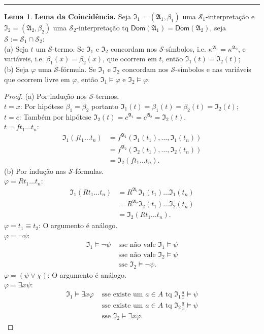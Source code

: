 \documentclass[11pt]{article}
\theoremstyle{definition}
\newtheorem{lemma}{Lema}
\newcommand{\mc}[1]{\mathcal{#1}}
\newcommand{\mf}[1]{\mathfrak{#1}}
\newcommand{\msf}[1]{\mathsf{#1}}
\begin{document}
\hrule

\begin{lemma}
\textbf{Lema da Coincidência.} Seja $\mf{I}_1=(\mf{A}_1,\beta_1)$ uma $\mc{S}_1$-interpretação e $\mf{I}_2=(\mf{A}_2,\beta_2)$ uma $\mc{S}_2$-interpretação tq $\msf{Dom}(\mf{A}_1)=\msf{Dom}(\mf{A}_2)$, seja $\mc{S}:=\mc{S}_1\cap\mc{S}_2$:\\
(a) Seja $t$ um $\mc{S}$-termo. Se $\mf{I}_1$ e $\mf{I}_2$ concordam nos $\mc{S}$-símbolos, i.e. $\kappa^\mf{A_1}=\kappa^\mf{A_2}$, e variáveis, i.e. $\beta_1(x)=\beta_2(x)$, que ocorrem em $t$, então $\mf{I}_1(t)=\mf{I}_2(t)$;\\
(b) Seja $\varphi$ uma $\mc{S}$-fórmula. Se $\mf{I}_1$ e $\mf{I}_2$ concordam nos $\mc{S}$-símbolos e nas variáveis que ocorrem livre em $\varphi$, então $\mf{I}_1\vDash\varphi$ e $\mf{I}_2\vDash\varphi$.

\begin{proof}
(a) Por indução nos $\mc{S}$-termos.\\
$t=x$: Por hipótese $\beta_1=\beta_2$ portanto $\mf{I}_1(t)=\beta_1(t)=\beta_2(t)=\mf{I}_2(t)$;\\
$t=c$: Também por hipótese $\mf{I}_2(t)=c^\mf{A_1}=c^\mf{A_2}=\mf{I}_2(t)$.\\
$t=ft_1\dots t_n$:
\begin{align*}
    \mf{I}_1(ft_1\dots t_n) & = f^\mf{A_1}(\mf{I}_1(t_1),\dots,\mf{I}_1(t_n))\\
    & = f^\mf{A_2}(\mf{I}_2(t_1),\dots,\mf{I}_2(t_n))\\
    & = \mf{I}_2(ft_1\dots t_n).
\end{align*}
(b) Por indução nas $\mc{S}$-fórmulas.\\
$\varphi=Rt_1\dots t_n$:
\begin{align*}
    \mf{I}_1(Rt_1\dots t_n) & = R^\mf{A_1}\mf{I}_1(t_1)\dots\mf{I}_1(t_n)\\
    & = R^\mf{A_2}\mf{I}_2(t_1)\dots\mf{I}_2(t_n)\\
    & = \mf{I}_2(Rt_1\dots t_n).
\end{align*}
$\varphi=t_1\equiv t_2$: O argumento é análogo.\\
$\varphi=\neg\psi$:
\begin{align*}
    \mf{I}_1\vDash\neg\psi & \text{ sse não vale }\mf{I}_1\vDash\psi\\
    & \text{ sse não vale }\mf{I}_2\vDash\psi\\
    & \text{ sse }\mf{I}_2\vDash\neg\psi.
\end{align*}
$\varphi=(\psi\vee\chi)$: O argumento é análogo.\\
$\varphi=\exists x\psi$:\\
\begin{align*}
    \mf{I}_1\vDash\exists x\varphi & \text{ sse existe um }a\in A\text{ tq }\mf{I}_1\frac{a}{x}\vDash\psi\\
    & \text{ sse existe um }a\in A\text{ tq }\mf{I}_2\frac{a}{x}\vDash\psi\\
    &\text{ sse }\mf{I}_2\vDash\exists x\varphi.
\end{align*}
\end{proof}
\end{lemma}
\end{document}
